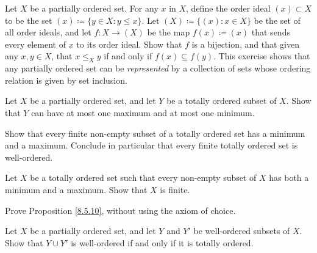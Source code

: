 \begin{exercise}\label{ex 8.5.6}
    Let \(X\) be a partially ordered set.
    For any \(x\) in \(X\), define the order ideal \((x) \subset X\) to be the set \((x) \coloneqq \{y \in X : y \leq x\}\).
    Let \((X) \coloneqq \{(x) : x \in X\}\) be the set of all order ideals, and let \(f : X \to (X)\) be the map \(f(x) \coloneqq (x)\) that sends every element of \(x\) to its order ideal.
    Show that \(f\) is a bijection, and that given any \(x, y \in X\), that \(x \leq_X y\) if and only if \(f(x) \subseteq f(y)\).
    This exercise shows that any partially ordered set can be \emph{represented} by a collection of sets whose ordering relation is given by set inclusion.
\end{exercise}

\begin{exercise}\label{ex 8.5.7}
    Let \(X\) be a partially ordered set, and let \(Y\) be a totally ordered subset of \(X\).
    Show that \(Y\) can have at most one maximum and at most one minimum.
\end{exercise}

\begin{exercise}\label{ex 8.5.8}
    Show that every finite non-empty subset of a totally ordered set has a minimum and a maximum.
    Conclude in particular that every finite totally ordered set is well-ordered.
\end{exercise}

\begin{exercise}\label{ex 8.5.9}
    Let \(X\) be a totally ordered set such that every non-empty subset of \(X\) has both a minimum and a maximum.
    Show that \(X\) is finite.
\end{exercise}

\begin{exercise}\label{ex 8.5.10}
    Prove Proposition \ref{8.5.10}, without using the axiom of choice.
\end{exercise}

\begin{exercise}\label{ex 8.5.11}
    Let \(X\) be a partially ordered set, and let \(Y\) and \(Y'\) be well-ordered subsets of \(X\).
    Show that \(Y \cup Y'\) is well-ordered if and only if it is totally ordered.
\end{exercise}

